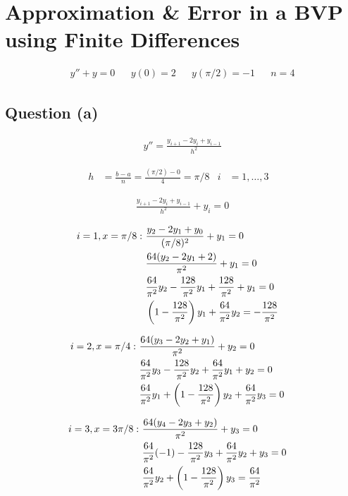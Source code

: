 \section{Approximation \& Error in a BVP using Finite Differences}

	\begin{align}
		&y'' + y = 0&
		&y(0) = 2&
		&y(\pi/2) = -1&
		&n = 4&
	\end{align}

	\subsection{Question (a)}

		\begin{align}
			&y'' = \frac{y_{i+1} - 2y_{i} + y_{i-1}}{h^{2}}&
		\end{align}

		\begin{align}
			h &= \frac{b-a}{n} = \frac{(\pi/2)-0}{4} = \pi/8&
			i &= 1,\dots,3&
		\end{align}

		\begin{align}
			&\frac{y_{i+1} - 2y_{i} + y_{i-1}}{h^{2}} + y_{i} = 0&
		\end{align}

		\begin{align}
			i=1,x=\pi/8: \ &
			\frac{y_{2} - 2y_{1} + y_{0}}{(\pi/8)^{2}} + y_{1} = 0
			& \\ &
			\frac{64(y_{2} - 2y_{1} + 2)}{\pi^{2}} + y_{1} = 0
			& \notag \\ &
			\frac{64}{\pi^{2}}y_{2} - \frac{128}{\pi^{2}}y_{1} + \frac{128}{\pi^{2}} + y_{1} = 0
			& \notag \\ &
			\left(1-\frac{128}{\pi^{2}}\right)y_{1} + \frac{64}{\pi^{2}}y_{2} = -\frac{128}{\pi^{2}}&
		\end{align}

		\begin{align}
			i=2,x=\pi/4: \ &
			\frac{64(y_{3} - 2y_{2} + y_{1})}{\pi^{2}} + y_{2} = 0
			& \\ &
			\frac{64}{\pi^{2}}y_{3} - \frac{128}{\pi^{2}}y_{2} + \frac{64}{\pi^{2}}y_{1} + y_{2} = 0
			& \notag \\ &
			\frac{64}{\pi^{2}}y_{1} + \left(1-\frac{128}{\pi^{2}}\right)y_{2} + \frac{64}{\pi^{2}}y_{3} = 0&
		\end{align}

		\begin{align}
			i=3,x=3\pi/8: \ &
			\frac{64(y_{4} - 2y_{3} + y_{2})}{\pi^{2}} + y_{3} = 0
			& \\ &
			\frac{64}{\pi^{2}}(-1) - \frac{128}{\pi^{2}}y_{3} + \frac{64}{\pi^{2}}y_{2} + y_{3} = 0
			& \notag \\ &
			\frac{64}{\pi^{2}}y_{2} + \left(1-\frac{128}{\pi^{2}}\right)y_{3} = \frac{64}{\pi^{2}}&
		\end{align}

